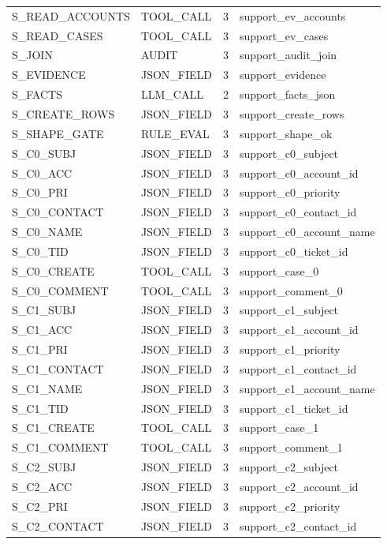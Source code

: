 {\begin{longtable}{p{5.0cm}p{3.1cm}p{1.0cm}p{5.0cm}}
S\_READ\_ACCOUNTS & TOOL\_CALL & 3 & support\_ev\_accounts \\
S\_READ\_CASES & TOOL\_CALL & 3 & support\_ev\_cases \\
S\_JOIN & AUDIT & 3 & support\_audit\_join \\
S\_EVIDENCE & JSON\_FIELD & 3 & support\_evidence \\
S\_FACTS & LLM\_CALL & 2 & support\_facts\_json \\
S\_CREATE\_ROWS & JSON\_FIELD & 3 & support\_create\_rows \\
S\_SHAPE\_GATE & RULE\_EVAL & 3 & support\_shape\_ok \\
S\_C0\_SUBJ & JSON\_FIELD & 3 & support\_c0\_subject \\
S\_C0\_ACC & JSON\_FIELD & 3 & support\_c0\_account\_id \\
S\_C0\_PRI & JSON\_FIELD & 3 & support\_c0\_priority \\
S\_C0\_CONTACT & JSON\_FIELD & 3 & support\_c0\_contact\_id \\
S\_C0\_NAME & JSON\_FIELD & 3 & support\_c0\_account\_name \\
S\_C0\_TID & JSON\_FIELD & 3 & support\_c0\_ticket\_id \\
S\_C0\_CREATE & TOOL\_CALL & 3 & support\_case\_0 \\
S\_C0\_COMMENT & TOOL\_CALL & 3 & support\_comment\_0 \\
S\_C1\_SUBJ & JSON\_FIELD & 3 & support\_c1\_subject \\
S\_C1\_ACC & JSON\_FIELD & 3 & support\_c1\_account\_id \\
S\_C1\_PRI & JSON\_FIELD & 3 & support\_c1\_priority \\
S\_C1\_CONTACT & JSON\_FIELD & 3 & support\_c1\_contact\_id \\
S\_C1\_NAME & JSON\_FIELD & 3 & support\_c1\_account\_name \\
S\_C1\_TID & JSON\_FIELD & 3 & support\_c1\_ticket\_id \\
S\_C1\_CREATE & TOOL\_CALL & 3 & support\_case\_1 \\
S\_C1\_COMMENT & TOOL\_CALL & 3 & support\_comment\_1 \\
S\_C2\_SUBJ & JSON\_FIELD & 3 & support\_c2\_subject \\
S\_C2\_ACC & JSON\_FIELD & 3 & support\_c2\_account\_id \\
S\_C2\_PRI & JSON\_FIELD & 3 & support\_c2\_priority \\
S\_C2\_CONTACT & JSON\_FIELD & 3 & support\_c2\_contact\_id \\

\end{longtable}}
